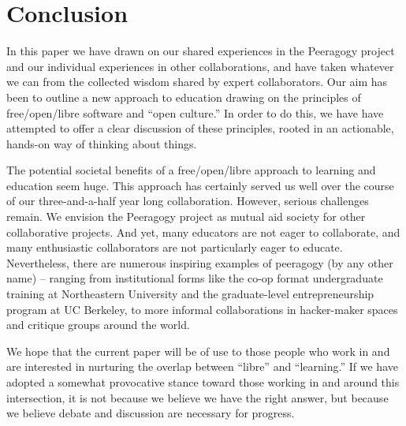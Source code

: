 \section{Conclusion}\label{sec:Conclusion}

In this paper we have drawn on our shared experiences in the Peeragogy
project and our individual experiences in other collaborations, and
have taken whatever we can from the collected wisdom shared by expert
collaborators.  Our aim has been to outline a new approach to
education drawing on the principles of free/open/libre software and
``open culture.''  In order to do this, we have have attempted to
offer a clear discussion of these principles, rooted in an actionable,
hands-on way of thinking about things.

The potential societal benefits of a free/open/libre approach to
learning and education seem huge.  This approach has certainly served
us well over the course of our three-and-a-half year long
collaboration.  However, serious challenges remain.  We envision the
Peeragogy project as mutual aid society for other collaborative
projects.  And yet, many educators are not eager to collaborate, and
many enthusiastic collaborators are not particularly eager to educate.
Nevertheless, there are numerous inspiring examples of peeragogy (by
any other name) -- ranging from institutional forms like the co-op
format undergraduate training at Northeastern University and the
graduate-level entrepreneurship program at UC Berkeley, to more
informal collaborations in hacker-maker spaces and critique groups
around the world.

We hope that the current paper will be of use to those people who work
in and are interested in nurturing the overlap between ``libre'' and
``learning.''  If we have adopted a somewhat provocative stance toward
those working in and around this intersection, it is not because we
believe we have the right answer, but because we believe debate and
discussion are necessary for progress.


